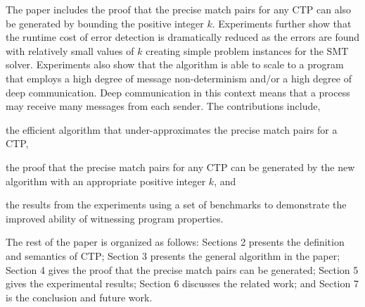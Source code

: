 The paper includes the proof that the precise match pairs for any CTP can also be generated by bounding the positive integer $k$. 
Experiments further show that the runtime cost of error detection is dramatically reduced as the errors are found with relatively small values of $k$ creating simple problem instances for the SMT solver. 
Experiments also show that the algorithm is able to scale to a program that employs a high degree of message non-determinism and/or a high degree of deep communication.
Deep communication in this context means that a process may receive many messages from each sender.
The contributions include,
\begin{compactitem}
\item the efficient algorithm that under-approximates the precise match pairs for a CTP, 
\item the proof that the precise match pairs for any CTP can be generated by the new algorithm with an appropriate positive integer $k$, and
\item the results from the experiments using a set of benchmarks to demonstrate the improved ability of witnessing program properties.
\end{compactitem}

The rest of the paper is organized as follows: 
Sections 2 presents the definition and semantics of CTP; Section 3 presents the general algorithm in the paper; Section 4 gives the proof that the precise match pairs can be generated; Section 5 gives the experimental results; Section 6 discusses the related work; and Section 7 is the conclusion and future work.
